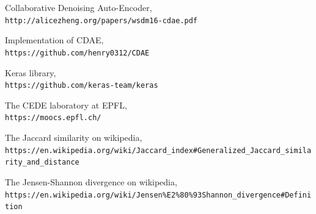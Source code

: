 \documentclass{article}
\begin{document}
\begin{thebibliography}{23}
Collaborative Denoising Auto-Encoder,
\\\texttt{http://alicezheng.org/papers/wsdm16-cdae.pdf}

Implementation of CDAE,
\\\texttt{https://github.com/henry0312/CDAE}

Keras library,
\\\texttt{https://github.com/keras-team/keras}

The CEDE laboratory at EPFL,
\\\texttt{https://moocs.epfl.ch/}

The Jaccard similarity on wikipedia,
\\\texttt{https://en.wikipedia.org/wiki/Jaccard\_index\#Generalized\_Jaccard\_similarity\_and\_distance}

The Jensen-Shannon divergence on wikipedia,
\\\texttt{https://en.wikipedia.org/wiki/Jensen\%E2\%80\%93Shannon\_divergence\#Definition}

\end{thebibliography}
\end{document}

